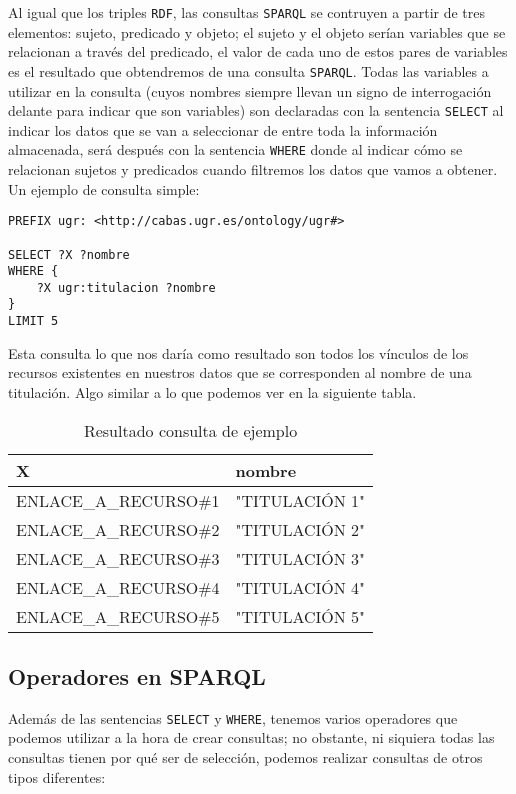 \bigskip
Al igual que los triples {\tt RDF}, las consultas {\tt SPARQL} se contruyen a partir de tres elementos: sujeto, predicado y objeto; el sujeto y el objeto serían variables que se relacionan a través del predicado, el valor de cada uno de estos pares de variables es el resultado que obtendremos de una consulta {\tt SPARQL}. Todas las variables a utilizar en la consulta (cuyos nombres siempre llevan un signo de interrogación delante para indicar que son variables) son declaradas con la sentencia {\tt SELECT} al indicar los datos que se van a seleccionar de entre toda la información almacenada, será después con la sentencia {\tt WHERE} donde al indicar cómo se relacionan sujetos y predicados cuando filtremos los datos que vamos a obtener. Un ejemplo de consulta simple: 

\begin{verbatim}
PREFIX ugr: <http://cabas.ugr.es/ontology/ugr#>

SELECT ?X ?nombre
WHERE {
    ?X ugr:titulacion ?nombre
}
LIMIT 5
\end{verbatim}

Esta consulta lo que nos daría como resultado son todos los vínculos de los recursos existentes en nuestros datos que se corresponden al nombre de una titulación. Algo similar a lo que podemos ver en la siguiente tabla.

\begin{table}[!ht]
	\centering
	\begin{tabular}{|p{}|p{}|}
		\hline
		\textbf{X} &
		\textbf{nombre}
		\\ \hline
		ENLACE\_A\_RECURSO\#1&
		"TITULACIÓN 1"
		\\ \hline
		ENLACE\_A\_RECURSO\#2&
		"TITULACIÓN 2"
		\\ \hline
		ENLACE\_A\_RECURSO\#3&
		"TITULACIÓN 3"
		\\ \hline
		ENLACE\_A\_RECURSO\#4&
		"TITULACIÓN 4"
		\\ \hline
		ENLACE\_A\_RECURSO\#5&
		"TITULACIÓN 5"
		\\ \hline
	\end{tabular}
	\caption{Resultado consulta de ejemplo}
	\label{consulta-ejemplo}
\end{table}

\subsection{Operadores en SPARQL}

Además de las sentencias {\tt SELECT} y {\tt WHERE}, tenemos varios operadores que podemos utilizar a la hora de crear consultas; no obstante, ni siquiera todas las consultas tienen por qué ser de selección, podemos realizar consultas de otros tipos diferentes:

